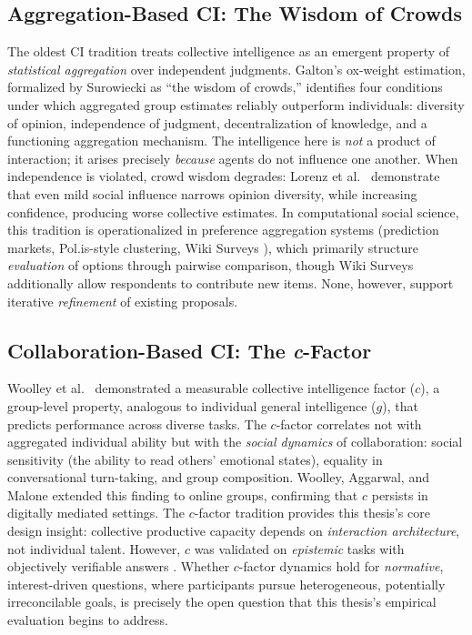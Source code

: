 \documentclass[a4paper, 12pt, twoside]{iviathesis}
\begin{document}
\subsection{Aggregation-Based CI: The Wisdom of Crowds}

The oldest CI tradition treats collective intelligence as an emergent property of \textit{statistical aggregation} over independent judgments. Galton's \cite{galton1907} ox-weight estimation, formalized by Surowiecki \cite{surowiecki2004} as ``the wisdom of crowds,'' identifies four conditions under which aggregated group estimates reliably outperform individuals: diversity of opinion, independence of judgment, decentralization of knowledge, and a functioning aggregation mechanism. The intelligence here is \textit{not} a product of interaction; it arises precisely \textit{because} agents do not influence one another. When independence is violated, crowd wisdom degrades: Lorenz et al.\ \cite{lorenz2011social} demonstrate that even mild social influence narrows opinion diversity, while increasing confidence, producing worse collective estimates. In computational social science, this tradition is operationalized in preference aggregation systems (prediction markets, Pol.is-style clustering, Wiki Surveys \cite{salganik2015wikisurveys}), which primarily structure \textit{evaluation} of options through pairwise comparison, though Wiki Surveys additionally allow respondents to contribute new items. None, however, support iterative \textit{refinement} of existing proposals.

\subsection{Collaboration-Based CI: The \textit{c}-Factor}

Woolley et al.\ \cite{woolley2010evidence} demonstrated a measurable collective intelligence factor ($c$), a group-level property, analogous to individual general intelligence ($g$), that predicts performance across diverse tasks. The $c$-factor correlates not with aggregated individual ability but with the \textit{social dynamics} of collaboration: social sensitivity (the ability to read others' emotional states), equality in conversational turn-taking, and group composition. Woolley, Aggarwal, and Malone \cite{woolley2015collective} extended this finding to online groups, confirming that $c$ persists in digitally mediated settings. The $c$-factor tradition provides this thesis's core design insight: collective productive capacity depends on \textit{interaction architecture}, not individual talent. However, $c$ was validated on \textit{epistemic} tasks with objectively verifiable answers \cite{landemore2013, ancell2017}. Whether $c$-factor dynamics hold for \textit{normative}, interest-driven questions, where participants pursue heterogeneous, potentially irreconcilable goals, is precisely the open question that this thesis's empirical evaluation begins to address.
\end{document}
